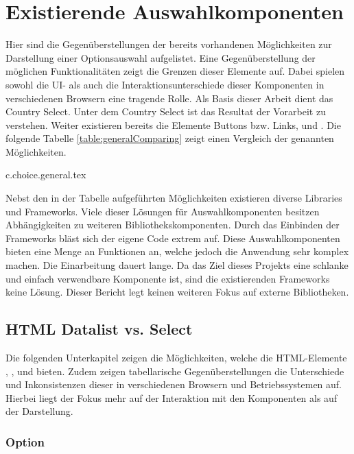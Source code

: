 \chapter{Existierende Auswahlkomponenten}
\label{chap:existingComponents}

Hier sind die Gegenüberstellungen der bereits vorhandenen Möglichkeiten zur Darstellung einer Optionsauswahl aufgelistet. 
Eine Gegenüberstellung der möglichen Funktionalitäten zeigt die Grenzen dieser Elemente auf. 
Dabei spielen sowohl die UI- als auch die Interaktionsunterschiede dieser Komponenten in verschiedenen Browsern eine tragende Rolle. 
Als Basis dieser Arbeit dient das Country Select. 
Unter dem Country Select ist das Resultat der Vorarbeit zu verstehen. 
Weiter existieren bereits die Elemente Buttons bzw. Links,  und . 
Die folgende Tabelle \ref{table:generalComparing} zeigt einen Vergleich der genannten Möglichkeiten. 

{c.choice.general.tex}

Nebst den in der Tabelle aufgeführten Möglichkeiten existieren diverse Libraries und Frameworks. 
Viele dieser Lösungen für Auswahlkomponenten besitzen Abhängigkeiten zu weiteren Bibliothekskomponenten. 
Durch das Einbinden der Frameworks bläst sich der eigene Code extrem auf. 
Diese Auswahlkomponenten bieten eine Menge an Funktionen an, welche jedoch die Anwendung sehr komplex machen. 
Die Einarbeitung dauert lange. 
Da das Ziel dieses Projekts eine schlanke und einfach verwendbare Komponente ist, sind die existierenden Frameworks keine Lösung. 
Dieser Bericht legt keinen weiteren Fokus auf externe Bibliotheken. 


\section{HTML Datalist vs. Select}
\label{sec:datalistSelect}

Die folgenden Unterkapitel zeigen die Möglichkeiten, welche die HTML-Elemente , ,  und  bieten. 
Zudem zeigen tabellarische Gegenüberstellungen die Unterschiede und Inkonsistenzen dieser in verschiedenen Browsern und Betriebssystemen auf. 
Hierbei liegt der Fokus mehr auf der Interaktion mit den Komponenten als auf der Darstellung. 


\subsection{Option}
\label{sec:option}


